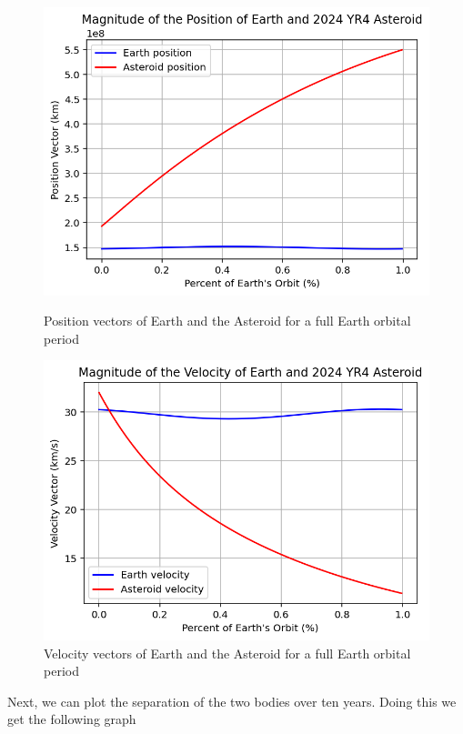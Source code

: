 \documentclass[12pt,twocolumn]{article}  %
\begin{document}
\begin{figure}[H]
    \centering
    \begin{minipage}{0.48\textwidth}
        \centering
        \includegraphics[width=\textwidth]{Images/114-pos.png}
        \caption{Position vectors of Earth and the Asteroid for a full Earth orbital period}
    \end{minipage}
    \hfill
    \begin{minipage}{0.48\textwidth}
        \centering
        \includegraphics[width=\textwidth]{Images/114-vel.png}
        \caption{Velocity vectors of Earth and the Asteroid for a full Earth orbital period}
    \end{minipage}
\end{figure}
\vspace{-0.2cm}
\noindent Next, we can plot the separation of the two bodies over ten years. Doing this we get the following graph
\end{document}
